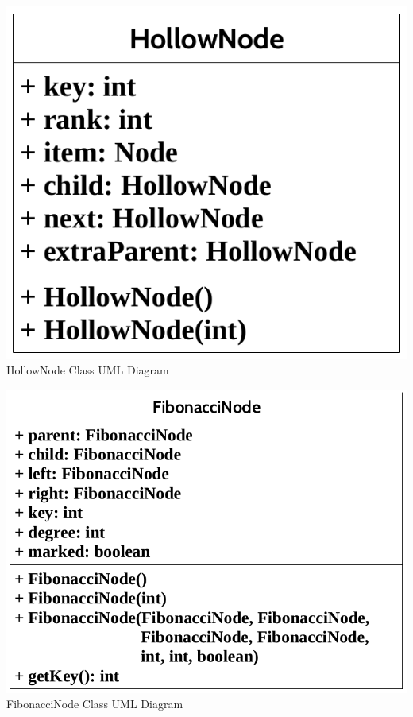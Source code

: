 \documentclass[letter,10pt]{article}
\begin{document}
\medskip
\phantom{helloworld}
\begin{center}
	\includegraphics[scale=.32]{hollownodeuml.png}\\
	HollowNode Class UML Diagram
\end{center}

\medskip

\begin{center}
	\includegraphics[scale=.32]{fibonaccinode.png}\\
	FibonacciNode Class UML Diagram
\end{center}
\end{document}
